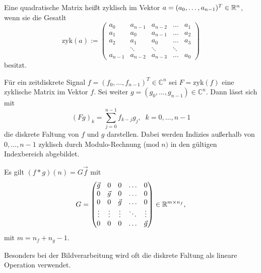 \begin{defi}
    Eine quadratische Matrix heißt zyklisch im Vektor $a=(a_0, \ldots, a_{n-1})^T \in \mathbb{R}^n$, wenn sie die Gesatlt
    \begin{equation*}
        \mathrm{zyk}(a):=
        \begin{pmatrix}
            a_0 & a_{n-1} &a_{n-2} &\ldots &a_1 \\ 
            a_1 & a_0 &a_{n-1} & \ldots &a_2 \\
            a_2 & a_1 &a_0 & \ldots &a_3 \\
             &\ddots &\ddots &\ddots & \\
            a_{n-1} &a_{n-2} &a_{n-3} &\ldots &a_0
        \end{pmatrix}
    \end{equation*}
    besitzt.
\end{defi}    
    
\begin{bem}
Für ein zeitdiskrete Signal $f=(f_0, \ldots, f_{n-1})^T \in \mathbb{C}^{n}$ sei $F=\mathrm{zyk}(f)$ eine zyklische Matrix im Vektor $f$. Sei weiter $g=(g_0, \ldots, g_{n-1}) \in \mathbb{C}^{n}$. Dann lässt sich mit
    \begin{equation*}
        (F g)_k=\sum_{j=0}^{n-1}  f_{k-j} g_j,  \; \; k=0, \ldots, n-1
    \end{equation*}
    die diskrete Faltung von $f$ und $g$ darstellen. Dabei werden Indizies außerhalb von $0, \ldots, n-1$ zyklisch durch Modulo-Rechnung ($\mathrm{mod} \; n)$ in den gültigen Indexbereich abgebildet.
\end{bem}

Es gilt $(f \ast g)(n) =G \vec{f}$ mit 
    \begin{equation*}
        G=\begin{pmatrix}
            \vec{g} & 0 &0 &\ldots &0 \\ 
            0 & \vec{g} &0 & \ldots &0 \\
            0 & 0 &\vec{g} &\ldots &0 \\
            \vdots &\vdots &\vdots &\ddots &\vdots \\
            0 &0 &0 &\ldots &\vec{g}
        \end{pmatrix} \in \mathbb{R}^{m \times n_f},
    \end{equation*}
    mit $m=n_f+n_g-1$.

Besonders bei der Bildverarbeitung wird oft die diskrete Faltung als lineare Operation verwendet. 

